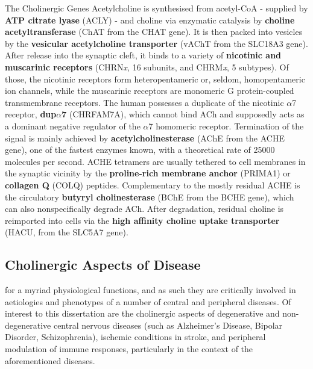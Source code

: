 \begin{mybox}{The Cholinergic Genes}\label{box:chol-genes}
Acetylcholine is synthesised from acetyl-CoA - supplied by \textbf{ATP citrate lyase} (ACLY) - and choline via enzymatic catalysis by \textbf{choline acetyltransferase} (ChAT from the CHAT gene). It is then packed into vesicles by the \textbf{vesicular acetylcholine transporter} (vAChT from the SLC18A3 gene). After release into the synaptic cleft, it binds to a variety of \textbf{nicotinic and muscarinic receptors} (CHRN\emph{x}, 16 subunits, and CHRM\emph{x}, 5 subtypes). Of those, the nicotinic receptors form heteropentameric or, seldom, homopentameric ion channels, while the muscarinic receptors are monomeric G protein-coupled transmembrane receptors. The human possesses a duplicate of the nicotinic $\alpha$7 receptor, \textbf{dup$\alpha$7} (CHRFAM7A), which cannot bind ACh and supposedly acts as a dominant negative regulator of the $\alpha$7 homomeric receptor. Termination of the signal is mainly achieved by \textbf{acetylcholinesterase} (AChE from the ACHE gene), one of the fastest enzymes known, with a theoretical rate of \num{25000} molecules per second. ACHE tetramers are usually tethered to cell membranes in the synaptic vicinity by the \textbf{proline-rich membrane anchor} (PRIMA1) or \textbf{collagen Q} (COLQ) peptides. Complementary to the mostly residual ACHE is the circulatory \textbf{butyryl cholinesterase} (BChE from the BCHE gene), which can also nonspecifically degrade ACh. After degradation, residual choline is reimported into cells via the \textbf{high affinity choline uptake transporter} (HACU, from the SLC5A7 gene).
\end{mybox}

\subsection{Cholinergic Aspects of Disease} \label{sec:intro:diseases}
 for a myriad physiological functions, and as such they are critically involved in aetiologies and phenotypes of a number of central and peripheral diseases. Of interest to this dissertation are the cholinergic aspects of degenerative and non-degenerative central nervous diseases (such as Alzheimer's Disease, Bipolar Disorder, Schizophrenia), ischemic conditions in stroke, and peripheral modulation of immune responses, particularly in the context of the aforementioned diseases.

